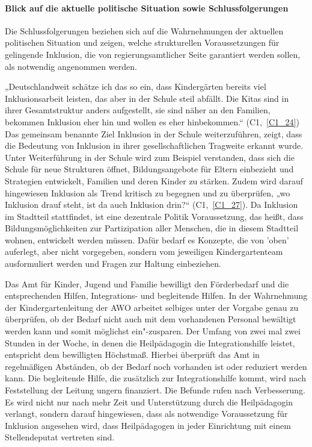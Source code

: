 \paragraph{Blick auf die aktuelle politische Situation sowie Schlussfolgerungen}

Die Schlussfolgerungen beziehen sich auf die Wahrnehmungen der aktuellen politischen Situation und zeigen, welche strukturellen Voraussetzungen für gelingende Inklusion, die von regierungsamtlicher Seite garantiert werden sollen, als notwendig angenommen werden.
 
„Deutschlandweit schätze ich das so ein, dass Kindergärten bereits viel Inklusionsarbeit leisten, das aber in der Schule steil abfällt. Die Kitas sind in ihrer Gesamtstruktur anders aufgestellt, sie sind näher an den Familien, bekommen Inklusion eher hin und wollen es eher hinbekommen.“ (C1,~\ref{C1_24}) Das gemeinsam benannte Ziel Inklusion in der Schule weiterzuführen, zeigt, dass die Bedeutung von Inklusion in ihrer gesellschaftlichen Tragweite erkannt wurde. Unter Weiterführung in der Schule wird zum Beispiel verstanden, dass sich die Schule für neue Strukturen öffnet, Bildungsangebote für Eltern einbezieht und Strategien entwickelt, Familien und deren Kinder zu stärken. Zudem wird darauf hingewiesen Inklusion als Trend kritisch zu begegnen und zu überprüfen, „wo Inklusion drauf steht, ist da auch Inklusion drin?“ (C1,~\ref{C1_27}). 
Da Inklusion im Stadtteil stattfindet, ist eine dezentrale Politik Voraussetzung, das heißt, dass Bildungsmöglichkeiten zur Partizipation aller Menschen, die in diesem Stadtteil wohnen, entwickelt werden müssen. Dafür bedarf es Konzepte, die von 'oben' auferlegt, aber nicht vorgegeben, sondern vom jeweiligen Kindergartenteam ausformuliert werden und Fragen zur Haltung einbeziehen.

Das Amt für Kinder, Jugend und Familie bewilligt den Förderbedarf und die entsprechenden Hilfen, Integrations- und begleitende Hilfen. In der Wahrnehmung der Kindergartenleitung der AWO arbeitet selbiges unter der Vorgabe genau zu überprüfen, ob der Bedarf nicht auch mit dem vorhandenen Personal bewältigt werden kann und somit möglichst ein"-zusparen. Der Umfang von zwei mal zwei Stunden in der Woche, in denen die Heilpädagogin die Integrationshilfe leistet, entspricht dem  bewilligten Höchstmaß. Hierbei überprüft das Amt in regelmäßigen Abständen, ob der Bedarf noch vorhanden ist oder reduziert werden kann. Die begleitende Hilfe, die zusätzlich zur Integrationshilfe kommt, wird nach Feststellung der Leitung ungern finanziert. Die Befunde rufen nach Verbesserung. Es wird nicht nur nach mehr Zeit und Unterstützung durch die Heilpädagogin verlangt, sondern darauf hingewiesen, dass als notwendige Voraussetzung für Inklusion angesehen wird, dass Heilpädagogen in jeder Einrichtung mit einem Stellendeputat vertreten sind. 

